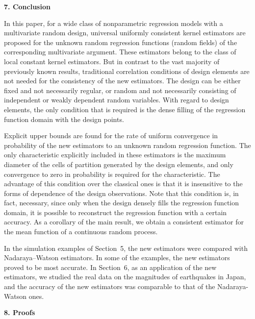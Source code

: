 \documentclass[12pt]{article}
\theoremstyle{remark}
\begin{document}

\begin{center}
{\bf 7. Conclusion}
\end{center}


In this paper, for a wide class of nonparametric regression models with a multivariate random design,
 universal uniformly consistent kernel estimators are  proposed for the unknown random regression functions (random fields) of the corresponding multivariate argument. These estimators belong
to the class of local constant kernel estimators.
But in contrast to the vast majority of previously known results, traditional correlation conditions of design elements
are not needed for the consistency of the new estimators.
The design can be either fixed and not necessarily regular, or random and not necessarily
consisting of independent or weakly dependent random variables. With regard to design elements, the only condition  that is required is the dense filling of the regression function domain with the design points.


Explicit upper bounds are found for the rate of uniform convergence in probability of the new estimators to an unknown random regression function.
The only characteristic explicitly included in these estimators is the maximum diameter of the cells of
partition generated by the design elements,
and only convergence to zero in probability is required for the characteristic.
The advantage of this condition over the classical ones
is that it is insensitive to the forms of dependence of the design observations.
Note that this condition is, in fact, necessary, since only when the design densely fills the regression function domain, it is possible to reconstruct the regression function with a certain accuracy. As a corollary of the main result, we obtain a consistent estimator for the mean function of a continuous random process.


In the simulation examples of Section~5, the new estimators were compared
with Nadaraya--Watson estimators. In some of the examples,
the new estimators proved to be most accurate.
In Section~6, as an application of the new estimators, we studied the real data on the magnitudes of earthquakes in Japan, and
the accuracy of the new estimators was comparable to that of the Nadaraya-Watson ones.



\begin{center}
{\bf 8. Proofs}
\end{center}
\end{document}
